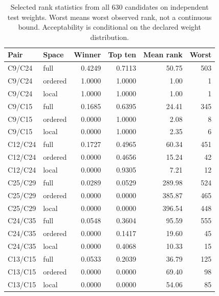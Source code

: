 \begin{table}[tbp]\caption{Selected rank statistics from all 630 candidates on independent test weights. Worst means worst observed rank, not a continuous bound. Acceptability is conditional on the declared weight distribution.}\label{tab:ranks}\centering
\small
\begin{tabular}{llrrrr}\toprule
Pair & Space & Winner & Top ten & Mean rank & Worst\\\midrule
C9/C24 & full & 0.4249 & 0.7113 & 50.75 & 503\\
C9/C24 & ordered & 1.0000 & 1.0000 & 1.00 & 1\\
C9/C24 & local & 1.0000 & 1.0000 & 1.00 & 1\\
C9/C15 & full & 0.1685 & 0.6395 & 24.41 & 345\\
C9/C15 & ordered & 0.0000 & 1.0000 & 2.08 & 8\\
C9/C15 & local & 0.0000 & 1.0000 & 2.35 & 6\\
C12/C24 & full & 0.1727 & 0.4965 & 60.34 & 451\\
C12/C24 & ordered & 0.0000 & 0.4656 & 15.24 & 42\\
C12/C24 & local & 0.0000 & 0.9305 & 7.21 & 12\\
C25/C29 & full & 0.0289 & 0.0529 & 289.98 & 524\\
C25/C29 & ordered & 0.0000 & 0.0000 & 385.87 & 465\\
C25/C29 & local & 0.0000 & 0.0000 & 396.54 & 448\\
C24/C35 & full & 0.0548 & 0.3604 & 95.59 & 555\\
C24/C35 & ordered & 0.0000 & 0.1417 & 19.60 & 45\\
C24/C35 & local & 0.0000 & 0.4068 & 10.33 & 15\\
C13/C15 & full & 0.0533 & 0.2039 & 36.79 & 125\\
C13/C15 & ordered & 0.0000 & 0.0000 & 69.40 & 98\\
C13/C15 & local & 0.0000 & 0.0000 & 54.06 & 85\\
\bottomrule\end{tabular}

\end{table}
